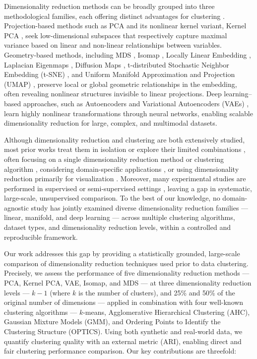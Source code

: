 \documentclass[preprint,12pt]{elsarticle}
\begin{document}
Dimensionality reduction methods can be broadly grouped into three methodological families, each offering distinct advantages for clustering \cite{niu2025exploring}. Projection-based methods such as PCA \cite{pearson1901liii} and its nonlinear kernel variant, Kernel PCA \cite{scholkopf1998kpca}, seek low-dimensional subspaces that respectively capture maximal variance based on linear and non-linear relationships between variables. Geometry-based methods, including MDS \cite{kruskal1964multidimensional}, Isomap \cite{tenenbaum2000isomap}, Locally Linear Embedding  \cite{sam2000lle}, Laplacian Eigenmaps \cite{belkin2003le}, Diffusion Maps \cite{coifman2006}, t-distributed Stochastic Neighbor Embedding (t-SNE) \cite{vandermaaten2008tsne}, and Uniform Manifold Approximation and Projection (UMAP) \cite{healy2024uniform}, preserve local or global geometric relationships in the embedding, often revealing nonlinear structures invisible to linear projections. Deep learning–based approaches, such as Autoencoders \cite{hinton2006ae} and Variational Autoencoders (VAEs) \cite{kingma2013vae}, learn highly nonlinear transformations through neural networks, enabling scalable dimensionality reduction for large, complex, and multimodal datasets.

Although dimensionality reduction and clustering are both extensively studied, most prior works treat them in isolation \cite{ray2021various,rodriguez2019clustering} or explore their limited combinations \cite{ding2004kmeanspca}, often focusing on a single dimensionality reduction method or clustering algorithm \cite{allaoui2020umap,alkhayrat2020comparative}, considering domain-specific applications \cite{rovira2022reactive,sun2024genomics}, or using dimensionality reduction primarily for visualization \cite{xia2022vis}. Moreover, many experimental studies are performed in supervised or semi-supervised settings \cite{ayesha2020overview}, leaving a gap in systematic, large-scale, unsupervised comparison. To the best of our knowledge, no domain-agnostic study has jointly examined diverse dimensionality reduction families — linear, manifold, and deep learning — across multiple clustering algorithms, dataset types, and dimensionality reduction levels, within a controlled and reproducible framework.

Our work addresses this gap by providing a statistically grounded, large-scale comparison of dimensionality reduction techniques used prior to data clustering. Precisely, we assess the performance of five dimensionality reduction methods — PCA, Kernel PCA, VAE, Isomap, and MDS — at three dimensionality reduction levels — $k-1$ (where $k$ is the number of clusters), and 25\% and 50\% of the original number of dimensions — applied in combination with four well-known clustering algorithms — $k$-means, Agglomerative Hierarchical Clustering (AHC), Gaussian Mixture Models (GMM), and Ordering Points to Identify the Clustering Structure (OPTICS). Using both synthetic and real-world data, we quantify clustering quality with an external metric (ARI), enabling direct and fair clustering performance comparison. Our key contributions are threefold:
\end{document}
